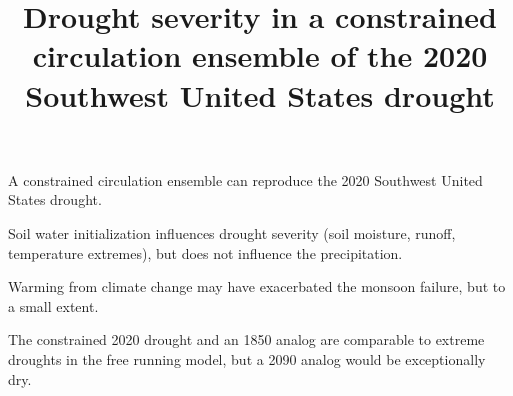 \documentclass[draft]{agujournal2019}
\begin{document}
%
\title{Drought severity in a constrained circulation ensemble of the 2020 Southwest United States drought}

%





\begin{keypoints}
	\item A constrained circulation ensemble can reproduce the 2020 Southwest United States drought.
	\item Soil water initialization influences drought severity (soil moisture, runoff, temperature extremes), but does not influence the precipitation.
	\item Warming from climate change may have exacerbated the monsoon failure, but to a small extent.
	\item The constrained 2020 drought and an 1850 analog are comparable to extreme droughts in the free running model, but a 2090 analog would be exceptionally dry.
\end{keypoints}

%
%

%
%

\end{document}
